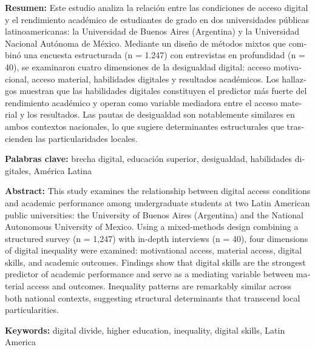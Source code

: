 \documentclass{article}
\begin{document}
\begin{tcolorbox}[colback=brown!8!white,colframe=brown!8!white,boxrule=0pt,arc=2pt,left=4pt,right=4pt,top=3pt,bottom=3pt,before skip=4pt,after skip=4pt]
\begin{otherlanguage}{spanish}
\sffamily\small \textbf{Resumen:} Este estudio analiza la relación entre las condiciones de acceso digital y el rendimiento académico de estudiantes de grado en dos universidades públicas latinoamericanas: la Universidad de Buenos Aires (Argentina) y la Universidad Nacional Autónoma de México. Mediante un diseño de métodos mixtos que combinó una encuesta estructurada (n = 1.247) con entrevistas en profundidad (n = 40), se examinaron cuatro dimensiones de la desigualdad digital: acceso motivacional, acceso material, habilidades digitales y resultados académicos. Los hallazgos muestran que las habilidades digitales constituyen el predictor más fuerte del rendimiento académico y operan como variable mediadora entre el acceso material y los resultados. Las pautas de desigualdad son notablemente similares en ambos contextos nacionales, lo que sugiere determinantes estructurales que trascienden las particularidades locales.
\par\smallskip\noindent\textbf{Palabras clave:} brecha digital, educación superior, desigualdad, habilidades digitales, América Latina
\end{otherlanguage}
\end{tcolorbox}

\begin{tcolorbox}[colback=brown!8!white,colframe=brown!8!white,boxrule=0pt,arc=2pt,left=4pt,right=4pt,top=3pt,bottom=3pt,before skip=4pt,after skip=4pt]
\begin{otherlanguage}{english}
\sffamily\small \textbf{Abstract:} This study examines the relationship between digital access conditions and academic performance among undergraduate students at two Latin American public universities: the University of Buenos Aires (Argentina) and the National Autonomous University of Mexico. Using a mixed-methods design combining a structured survey (n = 1,247) with in-depth interviews (n = 40), four dimensions of digital inequality were examined: motivational access, material access, digital skills, and academic outcomes. Findings show that digital skills are the strongest predictor of academic performance and serve as a mediating variable between material access and outcomes. Inequality patterns are remarkably similar across both national contexts, suggesting structural determinants that transcend local particularities.
\par\smallskip\noindent\textbf{Keywords:} digital divide, higher education, inequality, digital skills, Latin America
\end{otherlanguage}
\end{tcolorbox}
\end{document}
